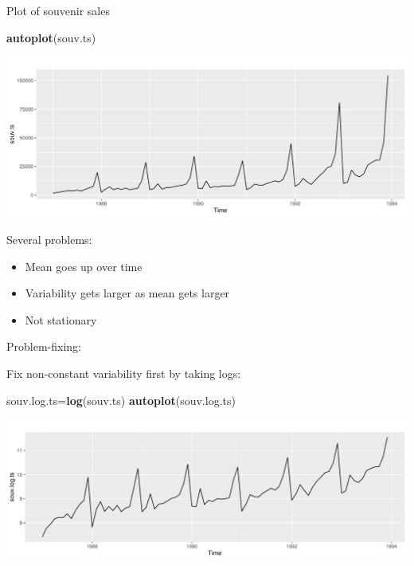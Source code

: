 \documentclass[
  ignorenonframetext,
]{beamer}
\newenvironment{Shaded}{\begin{snugshade}}{\end{snugshade}}
\newcommand{\KeywordTok}[1]{\textcolor[rgb]{0.13,0.29,0.53}{\textbf{#1}}}
\newcommand{\NormalTok}[1]{#1}
\providecommand{\tightlist}{%
  \setlength{\itemsep}{0pt}\setlength{\parskip}{0pt}}
\begin{document}
\begin{frame}[fragile]{Plot of souvenir sales}
\protect\hypertarget{plot-of-souvenir-sales}{}

\begin{Shaded}
\begin{Highlighting}[]
\KeywordTok{autoplot}\NormalTok{(souv.ts)}
\end{Highlighting}
\end{Shaded}

\includegraphics{slides_d29_files/figure-beamer/unnamed-chunk-545-1.pdf}

\end{frame}

\begin{frame}{Several problems:}
\protect\hypertarget{several-problems}{}

\begin{itemize}
\tightlist
\item
  Mean goes up over time
\item
  Variability gets larger as mean gets larger
\item
  Not stationary
\end{itemize}

\end{frame}

\begin{frame}[fragile]{Problem-fixing:}
\protect\hypertarget{problem-fixing}{}

Fix non-constant variability first by taking logs:

\begin{Shaded}
\begin{Highlighting}[]
\NormalTok{souv.log.ts=}\KeywordTok{log}\NormalTok{(souv.ts)}
\KeywordTok{autoplot}\NormalTok{(souv.log.ts)}
\end{Highlighting}
\end{Shaded}

\includegraphics{slides_d29_files/figure-beamer/unnamed-chunk-546-1.pdf}

\end{frame}
\end{document}
